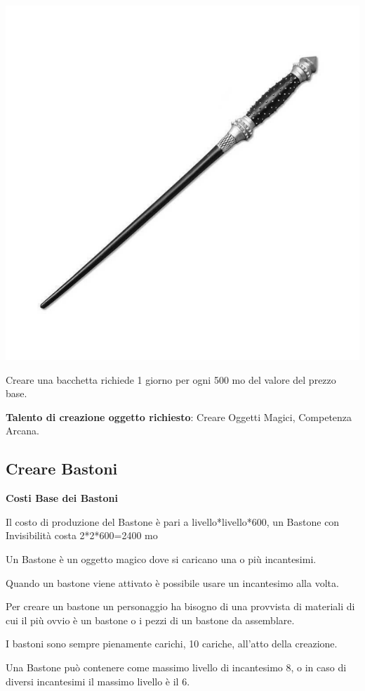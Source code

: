 \begin{multicols}{2}
\begin{center}
\includegraphics[width=0.5\linewidth]{immagini/wand.png}
\end{center}

Creare una bacchetta richiede 1 giorno per ogni 500 mo del valore del prezzo base.

\medskip

\textbf{Talento di creazione oggetto richiesto}: Creare Oggetti Magici, Competenza Arcana.

\subsection{Creare Bastoni}\label{crearebastoni}

\textbf{Costi Base dei Bastoni}

\bigskip

Il costo di produzione del Bastone è pari a livello*livello*600, un Bastone con Invisibilità costa 2*2*600=2400 mo

\bigskip

Un Bastone è un oggetto magico dove si caricano una o più incantesimi.

Quando un bastone viene attivato è possibile usare un incantesimo alla volta.

Per creare un bastone un personaggio ha bisogno di una provvista di materiali di cui il più ovvio è un bastone o i pezzi di un bastone da assemblare.

I bastoni sono sempre pienamente carichi, 10 cariche, all'atto della creazione.

Una Bastone può contenere come massimo livello di incantesimo 8, o in caso di diversi incantesimi il massimo livello è il 6.


\end{multicols}
